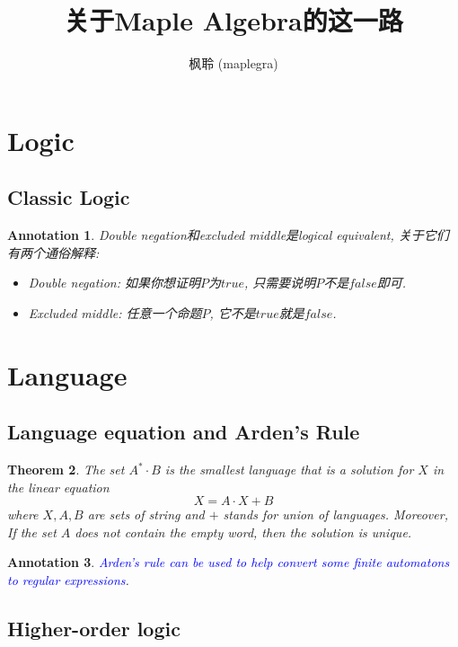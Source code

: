 \documentclass{article}
\newtheorem{theorem}{Theorem}[section]
\newtheorem{annotation}[theorem]{Annotation}
\newcommand{\bluet}[1]{\textcolor{blue}{#1}}
\begin{document}
\title{关于Maple Algebra的这一路}
\author{枫聆 (maplegra)}
\maketitle
\tableofcontents
\newpage

\section{Logic}

\subsection{Classic Logic}

\begin{annotation}
\rm Double negation和excluded middle是logical equivalent, 关于它们有两个通俗解释:
\begin{itemize}
	\item Double negation: 如果你想证明$P$为$true$, 只需要说明$P$不是$false$即可.
	\item Excluded middle: 任意一个命题$P$, 它不是$true$就是$false$.
\end{itemize}
\end{annotation}

\section{Language}

\subsection{Language equation and Arden's Rule}

\begin{theorem}
\rm The set $A^* \cdot B$ is the smallest language that is a solution for $X$ in the linear equation 
\[
	X = A \cdot X + B
\]
where $X, A, B$ are sets of string and $+$ stands for union of languages. Moreover, If the set $A$ does not contain the empty word, then the solution is unique.
\end{theorem}

\begin{annotation}
\rm \bluet{Arden's rule can be used to help convert some finite automatons to regular expressions}.
\end{annotation}

\subsection{Higher-order logic}
\end{document}
